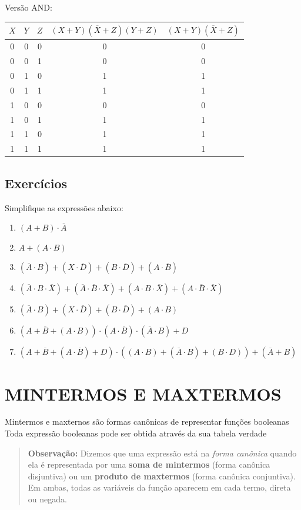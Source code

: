 \documentclass[12pt]{article}
\begin{document}
Versão AND:
\begin{center}
\begin{tabular}{|c|c|c|c|c|}
\hline
$X$  & $Y$ & $Z$ &  $(X + Y)(\overline{X} + Z)(Y + Z)$ & $(X + Y)(\overline{X} + Z)$ \\
\hline
0 & 0 & 0 & 0 & 0 \\
0 & 0 & 1 & 0 & 0 \\
0 & 1 & 0 & 1 & 1 \\
0 & 1 & 1 & 1 & 1 \\
1 & 0 & 0 & 0 & 0 \\
1 & 0 & 1 & 1 & 1 \\
1 & 1 & 0 & 1 & 1 \\
1 & 1 & 1 & 1 & 1 \\
\hline
\end{tabular}
\end{center}

\subsection{Exercícios}
Simplifique as expressões abaixo:
\begin{enumerate}
    \item $(A + B) \cdot \overline{A}$
    \item $A + (A \cdot B)$
    \item $(\overline{A} \cdot B) + (X \cdot \overline{D}) + (B \cdot \overline{D}) + (A \cdot \overline{B})$
    \item $(\overline{A} \cdot B \cdot \overline{X}) + (\overline{A} \cdot \overline{B} \cdot \overline{X}) + (A \cdot B \cdot \overline{X}) + (A \cdot \overline{B} \cdot \overline{X})$
    \item $(\overline{A} \cdot B) + (X \cdot \overline{D}) + (B \cdot \overline{D}) + (A \cdot B)$
    \item $(A + \overline{B} + (A \cdot B)) \cdot (A \cdot \overline{B}) \cdot (\overline{A} \cdot B) + D$
    \item $(A + \overline{B} + (A \cdot \overline{B}) + D) \cdot ((A \cdot B) + (\overline{A} \cdot B) + (B \cdot D)) + (\overline{A} + B)$
\end{enumerate}

\section{MINTERMOS E MAXTERMOS}
Mintermos e maxternos são formas canônicas de representar funções booleanas
Toda expressão booleanas pode ser obtida através da sua tabela verdade
\begin{quote}
\textbf{Observação:} Dizemos que uma expressão está na \textit{forma canônica} quando ela é representada por uma \textbf{soma de mintermos} (forma canônica disjuntiva) ou um \textbf{produto de maxtermos} (forma canônica conjuntiva). Em ambas, todas as variáveis da função aparecem em cada termo, direta ou negada.
\end{quote}
\end{document}
